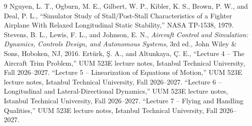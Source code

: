 \documentclass[conf]{new-aiaa}
\begin{document}
\begin{thebibliography}{9}
 Nguyen, L. T., Ogburn, M. E., Gilbert, W. P., Kibler, K. S., Brown, P. W., and Deal, P. L., ``Simulator Study of Stall/Post-Stall Characteristics of a Fighter Airplane With Relaxed Longitudinal Static Stability,'' NASA TP-1538, 1979.
 Stevens, B. L., Lewis, F. L., and Johnson, E. N., \emph{Aircraft Control and Simulation: Dynamics, Controls Design, and Autonomous Systems}, 3rd ed., John Wiley \& Sons, Hoboken, NJ, 2016.
 Ert\"urk, \c{S}. A., and Altunkaya, \c{C}. E., ``Lecture 4 -- The Aircraft Trim Problem,'' UUM 523E lecture notes, Istanbul Technical University, Fall 2026--2027.
 ``Lecture 5 -- Linearization of Equations of Motion,'' UUM 523E lecture notes, Istanbul Technical University, Fall 2026--2027.
 ``Lecture 6 -- Longitudinal and Lateral-Directional Dynamics,'' UUM 523E lecture notes, Istanbul Technical University, Fall 2026--2027.
 ``Lecture 7 -- Flying and Handling Qualities,'' UUM 523E lecture notes, Istanbul Technical University, Fall 2026--2027.
\end{thebibliography}
\end{document}
